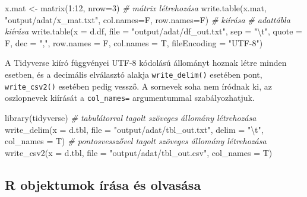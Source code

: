 \documentclass[
]{book}
\newenvironment{Shaded}{\begin{snugshade}}{\end{snugshade}}
\newcommand{\AttributeTok}[1]{\textcolor[rgb]{0.77,0.63,0.00}{#1}}
\newcommand{\CommentTok}[1]{\textcolor[rgb]{0.56,0.35,0.01}{\textit{#1}}}
\newcommand{\DecValTok}[1]{\textcolor[rgb]{0.00,0.00,0.81}{#1}}
\newcommand{\FunctionTok}[1]{\textcolor[rgb]{0.00,0.00,0.00}{#1}}
\newcommand{\NormalTok}[1]{#1}
\newcommand{\OtherTok}[1]{\textcolor[rgb]{0.56,0.35,0.01}{#1}}
\newcommand{\SpecialCharTok}[1]{\textcolor[rgb]{0.00,0.00,0.00}{#1}}
\newcommand{\StringTok}[1]{\textcolor[rgb]{0.31,0.60,0.02}{#1}}
\begin{document}
\begin{Shaded}
\begin{Highlighting}[]
\NormalTok{x.mat }\OtherTok{\textless{}{-}} \FunctionTok{matrix}\NormalTok{(}\DecValTok{1}\SpecialCharTok{:}\DecValTok{12}\NormalTok{, }\AttributeTok{nrow=}\DecValTok{3}\NormalTok{)                              }\CommentTok{\# mátrix létrehozása}
\FunctionTok{write.table}\NormalTok{(x.mat, }\StringTok{"output/adat/x\_mat.txt"}\NormalTok{, }\AttributeTok{col.names=}\NormalTok{F, }\AttributeTok{row.names=}\NormalTok{F) }\CommentTok{\# kiírása}
\CommentTok{\# adattábla kiírása}
\FunctionTok{write.table}\NormalTok{(}\AttributeTok{x =}\NormalTok{ d.df, }\AttributeTok{file =} \StringTok{"output/adat/df\_out.txt"}\NormalTok{, }\AttributeTok{sep =} \StringTok{"}\SpecialCharTok{\textbackslash{}t}\StringTok{"}\NormalTok{, }\AttributeTok{quote =}\NormalTok{ F,            }
            \AttributeTok{dec =} \StringTok{","}\NormalTok{, }\AttributeTok{row.names =}\NormalTok{ F, }\AttributeTok{col.names =}\NormalTok{ T, }\AttributeTok{fileEncoding =} \StringTok{"UTF{-}8"}\NormalTok{)}
\end{Highlighting}
\end{Shaded}

A Tidyverse kiíró függvényei UTF-8 kódolású állományt hoznak létre minden esetben, és a decimális elválasztó alakja \texttt{write\_delim()} esetében pont, \texttt{write\_csv2()} esetében pedig vessző. A sornevek soha nem íródnak ki, az oszlopnevek kiírását a \texttt{col\_names=} argumentummal szabályozhatjuk.

\begin{Shaded}
\begin{Highlighting}[]
\FunctionTok{library}\NormalTok{(tidyverse)}
\CommentTok{\# tabulátorral tagolt szöveges állomány létrehozása}
\FunctionTok{write\_delim}\NormalTok{(}\AttributeTok{x =}\NormalTok{ d.tbl, }\AttributeTok{file =} \StringTok{"output/adat/tbl\_out.txt"}\NormalTok{, }\AttributeTok{delim =} \StringTok{"}\SpecialCharTok{\textbackslash{}t}\StringTok{"}\NormalTok{, }\AttributeTok{col\_names =}\NormalTok{ T)}
\CommentTok{\# pontosvesszővel tagolt szöveges állomány létrehozása}
\FunctionTok{write\_csv2}\NormalTok{(}\AttributeTok{x =}\NormalTok{ d.tbl, }\AttributeTok{file =} \StringTok{"output/adat/tbl\_out.csv"}\NormalTok{, }\AttributeTok{col\_names =}\NormalTok{ T)}
\end{Highlighting}
\end{Shaded}

\hypertarget{r-objektumok-uxedruxe1sa-uxe9s-olvasuxe1sa}{%
\subsection{R objektumok írása és olvasása}\label{r-objektumok-uxedruxe1sa-uxe9s-olvasuxe1sa}}
\end{document}
